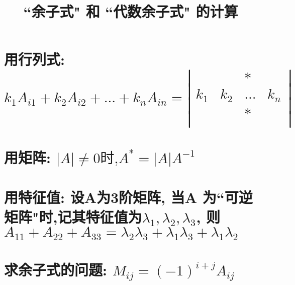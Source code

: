 \documentclass[UTF8]{ctexart}
\title{``余子式" 和 ``代数余子式" 的计算}
\begin{document}
	\tableofcontents %
	\date{} %
	\maketitle  %
	
	\section{用行列式: $
		k_1A_{i1}+k_2A_{i2}+...+k_nA_{in}=\left| \begin{matrix}
			&		&		*&		\\
			k_1&		k_2&		...&		k_n\\
			&		&		*&		\\
		\end{matrix} \right|
		$}
	
	
	\section{用矩阵: $\left| A \right|\ne 0\text{时,}A^*=\left| A \right|A^{-1}$}
	
	
	\section{用特征值: 设A为3阶矩阵, 当A 为``可逆矩阵"时,记其特征值为$\lambda _1,\lambda _2,\lambda _3$, 则$A_{11}+A_{22}+A_{33}=\lambda _2\lambda _3+\lambda _1\lambda _3+\lambda _1\lambda _2$}
		
		
	
	\section{求余子式的问题: $M_{ij}=\left( -1 \right) ^{i+j}A_{ij}$}	
	
	
	
\end{document}
